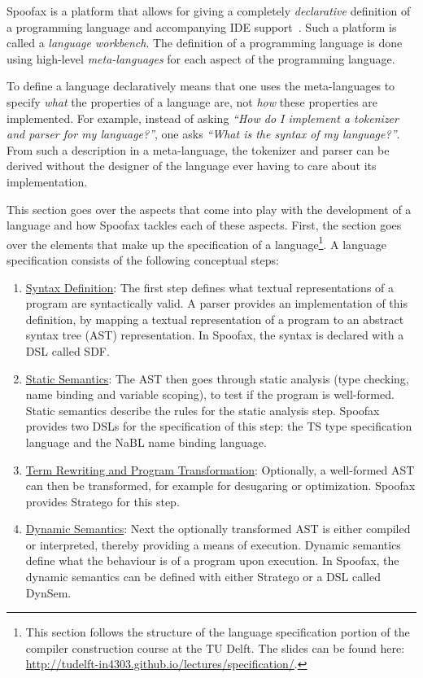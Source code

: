 Spoofax is a platform that allows for giving a completely
\emph{declarative} definition of a programming language and accompanying
IDE support~\cite{Kats10a}. Such a platform is called a \emph{language
workbench}. The definition of a programming language is done using
high-level \emph{meta-languages} for each aspect of the programming
language.

To define a language declaratively means that one uses the
meta-languages to specify \emph{what} the properties of a language are, not
\emph{how} these properties are implemented. For example, instead of asking
\emph{​``How do I implement a tokenizer and parser for my language?''​}, one
asks \emph{​``What is the syntax of my language?''​}. From such a description
in a meta-language, the tokenizer and parser can be derived without
the designer of the language ever having to care about its
implementation.

This section goes over the aspects that come into play with the
development of a language and how Spoofax tackles each of these
aspects. First, the section goes over the elements that make up the
specification of a language\footnote{This section follows
the structure of the language specification portion of the compiler
construction course at the TU Delft. The slides can be found here:
\url{http://tudelft-in4303.github.io/lectures/specification/}.}. A language
specification consists of the following conceptual steps:

\begin{enumerate}
\item \hyperref[sec:syntax-def]{Syntax Definition}: The first step defines what textual
representations of a program are syntactically valid. A parser
provides an implementation of this definition, by mapping a textual
representation of a program to an abstract syntax tree (AST)
representation. In Spoofax, the syntax is declared with a DSL
called SDF.
\item \hyperref[sec:static-analysis]{Static Semantics}: The AST then goes through static analysis (type
checking, name binding and variable scoping), to test if the
program is well-formed. Static semantics describe the rules for the
static analysis step. Spoofax provides two DSLs for the
specification of this step: the TS type specification language and
the NaBL name binding language.
\item \hyperref[sec:term-rewrite]{Term Rewriting and Program Transformation}: Optionally, a
well-formed AST can then be transformed, for example for desugaring
or optimization. Spoofax provides Stratego for this step.
\item \hyperref[sec:dynamic-semantics]{Dynamic Semantics}: Next the optionally transformed AST is either
compiled or interpreted, thereby providing a means of
execution. Dynamic semantics define what the behaviour is of a
program upon execution. In Spoofax, the dynamic semantics can be
defined with either Stratego or a DSL called DynSem.
\end{enumerate}

